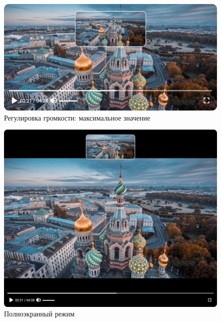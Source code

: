 	\begin{figure}[ht!]
		\center
		\includegraphics [scale=0.37] {my_folder/images//player_volume_full}
		\caption{Регулировка громкости: максимальное значение} 
		\label{fig:player_volume_full}
	\end{figure}

	\begin{figure}[ht!]
		\center
		\includegraphics [scale=0.37] {my_folder/images//player_full_screen}
		\caption{Полноэкранный режим} 
		\label{fig:player_full_screen}
	\end{figure}